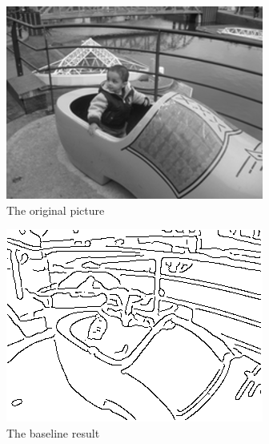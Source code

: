 \documentclass[10pt,final,journal]{IEEEtran}
\begin{document}
\begin{figure}[h!]
	\begin{subfigure}[b]{0.3\textwidth}
            \includegraphics[width=\textwidth]{klomp}
            \caption{The original picture}
            \label{fig:app_klomp}
    \end{subfigure}
    \begin{subfigure}[b]{0.3\textwidth}
            \includegraphics[width=\textwidth]{klomp_baseline}
            \caption{The baseline result}
            \label{fig:app_klomp_baseline}
    \end{subfigure}
    \begin{subfigure}[b]{0.3\textwidth}

\end{subfigure}
\end{figure}
\end{document}
